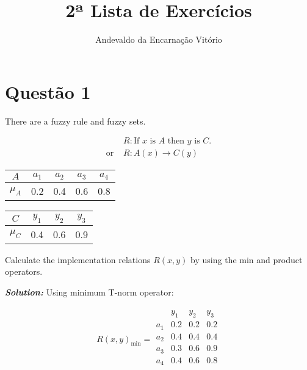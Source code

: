 \documentclass{article}
\title{2ª Lista de Exercícios}
\author{Andevaldo da Encarnação Vitório}
\date{}
\begin{document}
\maketitle

\section*{Questão 1}

There are a fuzzy rule and fuzzy sets.

\begin{align*}
             & R: \text{If } x \text{ is } A \text{ then } y \text{ is } C. \\
  \text{or } & R: A(x) \rightarrow C(y)
\end{align*}

\begin{table}[H]
  \centering
  \begin{minipage}{.45\linewidth}
    \centering
    \begin{tabular}{ccccc}
      \toprule
      $A$     & $a_1$ & $a_2$ & $a_3$ & $a_4$ \\
      \midrule
      $\mu_A$ & 0.2   & 0.4   & 0.6   & 0.8   \\
      \bottomrule
    \end{tabular}
  \end{minipage}%
  \begin{minipage}{.45\linewidth}
    \centering
    \begin{tabular}{cccc}
      \toprule
      $C$     & $y_1$ & $y_2$ & $y_3$ \\
      \midrule
      $\mu_C$ & 0.4   & 0.6   & 0.9   \\
      \bottomrule
    \end{tabular}
  \end{minipage}
\end{table}

Calculate the implementation relations $R(x, y)$ by using the min and product operators.

\vspace*{12pt}
\textit{\textbf{Solution:}} Using minimum T-norm operator:

\begin{gather*}
  R(x, y)_{\min} =
  \begin{array}{c|ccc}
        & y_1 & y_2 & y_3 \\
    \hline
    a_1 & 0.2 & 0.2 & 0.2 \\
    a_2 & 0.4 & 0.4 & 0.4 \\
    a_3 & 0.3 & 0.6 & 0.9 \\
    a_4 & 0.4 & 0.6 & 0.8 \\
  \end{array}
\end{gather*}
\end{document}
